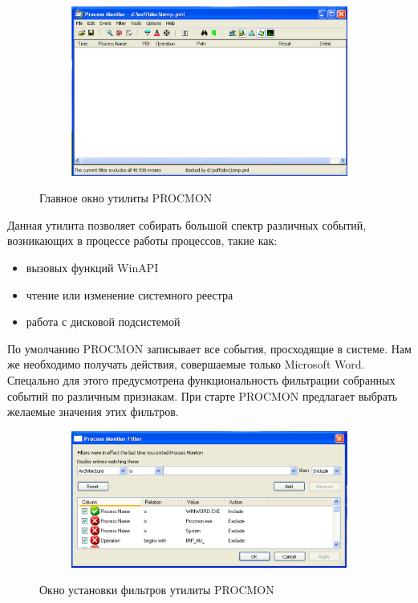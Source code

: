 \begin{figure}[ht]
	\centering
    \begin{subfigure}[b]{1\textwidth}
    \centering
        \includegraphics[scale=0.5]{procmon_main_window.png}        
    \end{subfigure}
 
    \caption{Главное окно утилиты PROCMON}
    \label{fig_parsetree}
\end{figure}

Данная утилита позволяет собирать большой спектр различных событий, возникающих в процессе работы процессов, такие как:
\begin{itemize}
\item вызовых функций WinAPI
\item чтение или изменение системного реестра
\item работа с дисковой подсистемой
\end{itemize}

По умолчанию PROCMON записывает все события, просходящие в системе. 
Нам же необходимо получать действия, совершаемые только Microsoft Word.
Спецально для этого предусмотрена функциональность фильтрации собранных событий по различным признакам.
При старте PROCMON предлагает выбрать желаемые значения этих фильтров.

\begin{figure}[ht]
	\centering
    \begin{subfigure}[b]{1\textwidth}
    \centering
        \includegraphics[scale=0.5]{procmon_filters.png}        
    \end{subfigure}
 
    \caption{Окно установки фильтров утилиты PROCMON}
    \label{fig_parsetree}
\end{figure}

